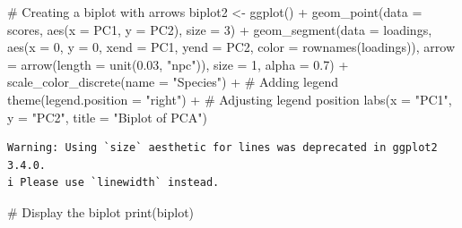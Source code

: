 \documentclass[
  letterpaper,
  DIV=11,
  numbers=noendperiod]{scrartcl}
\newenvironment{Shaded}{\begin{snugshade}}{\end{snugshade}}
\newcommand{\AttributeTok}[1]{\textcolor[rgb]{0.40,0.45,0.13}{#1}}
\newcommand{\CommentTok}[1]{\textcolor[rgb]{0.37,0.37,0.37}{#1}}
\newcommand{\DecValTok}[1]{\textcolor[rgb]{0.68,0.00,0.00}{#1}}
\newcommand{\FloatTok}[1]{\textcolor[rgb]{0.68,0.00,0.00}{#1}}
\newcommand{\FunctionTok}[1]{\textcolor[rgb]{0.28,0.35,0.67}{#1}}
\newcommand{\NormalTok}[1]{\textcolor[rgb]{0.00,0.23,0.31}{#1}}
\newcommand{\OtherTok}[1]{\textcolor[rgb]{0.00,0.23,0.31}{#1}}
\newcommand{\SpecialCharTok}[1]{\textcolor[rgb]{0.37,0.37,0.37}{#1}}
\newcommand{\StringTok}[1]{\textcolor[rgb]{0.13,0.47,0.30}{#1}}
\begin{document}
\begin{Shaded}
\begin{Highlighting}[]
\CommentTok{\# Creating a biplot with arrows}
\NormalTok{biplot2 }\OtherTok{\textless{}{-}} \FunctionTok{ggplot}\NormalTok{() }\SpecialCharTok{+}
  \FunctionTok{geom\_point}\NormalTok{(}\AttributeTok{data =}\NormalTok{ scores, }\FunctionTok{aes}\NormalTok{(}\AttributeTok{x =}\NormalTok{ PC1, }\AttributeTok{y =}\NormalTok{ PC2), }\AttributeTok{size =} \DecValTok{3}\NormalTok{) }\SpecialCharTok{+}
  \FunctionTok{geom\_segment}\NormalTok{(}\AttributeTok{data =}\NormalTok{ loadings, }\FunctionTok{aes}\NormalTok{(}\AttributeTok{x =} \DecValTok{0}\NormalTok{, }\AttributeTok{y =} \DecValTok{0}\NormalTok{, }\AttributeTok{xend =}\NormalTok{ PC1, }\AttributeTok{yend =}\NormalTok{ PC2, }\AttributeTok{color =} \FunctionTok{rownames}\NormalTok{(loadings)),}
               \AttributeTok{arrow =} \FunctionTok{arrow}\NormalTok{(}\AttributeTok{length =} \FunctionTok{unit}\NormalTok{(}\FloatTok{0.03}\NormalTok{, }\StringTok{"npc"}\NormalTok{)), }\AttributeTok{size =} \DecValTok{1}\NormalTok{, }\AttributeTok{alpha =} \FloatTok{0.7}\NormalTok{) }\SpecialCharTok{+}
  \FunctionTok{scale\_color\_discrete}\NormalTok{(}\AttributeTok{name =} \StringTok{"Species"}\NormalTok{) }\SpecialCharTok{+}  \CommentTok{\# Adding legend}
  \FunctionTok{theme}\NormalTok{(}\AttributeTok{legend.position =} \StringTok{"right"}\NormalTok{) }\SpecialCharTok{+}  \CommentTok{\# Adjusting legend position}
  \FunctionTok{labs}\NormalTok{(}\AttributeTok{x =} \StringTok{"PC1"}\NormalTok{, }\AttributeTok{y =} \StringTok{"PC2"}\NormalTok{, }\AttributeTok{title =} \StringTok{"Biplot of PCA"}\NormalTok{)}
\end{Highlighting}
\end{Shaded}

\begin{verbatim}
Warning: Using `size` aesthetic for lines was deprecated in ggplot2 3.4.0.
i Please use `linewidth` instead.
\end{verbatim}

\begin{Shaded}
\begin{Highlighting}[]
\CommentTok{\# Display the biplot}
\FunctionTok{print}\NormalTok{(biplot)}
\end{Highlighting}
\end{Shaded}
\end{document}
